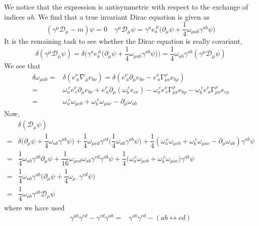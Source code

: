 \begin{recall}
We notice that the expression is antisymmetric with respect to the exchange of indices $ab$. We find that a true invariant Dirac equation is given as
\[(\gamma ^{\mu }\mathcal{D}_{\mu }-m)\psi =0\quad \gamma ^{\mu }\mathcal{D}_{\mu }\psi =\gamma ^{a}e_{a}^{\ \mu }\Big(\partial _{\mu }\psi +\dfrac{1}{4}\omega _{\mu ab}\gamma ^{ab}\psi \Big)\]
It is the remaining task to see whether the Dirac equation is really covariant,
\[\delta (\gamma ^{\mu }\mathcal{D}_{\mu }\psi )=\delta \Big(\gamma ^{a}e_{a}^{\ \mu }\Big(\partial _{\mu }\psi +\dfrac{1}{4}\omega _{\mu ab}\gamma ^{ab}\psi \Big)\Big)=\dfrac{1}{4}\omega _{ab}\gamma ^{ab}(\gamma ^{\mu }\mathcal{D}_{\mu }\psi )\]
We see that
\begin{align*}
\delta \omega _{\mu ab}=&\delta (e^{\nu }_{\ a}\nabla _{\mu }e_{b\nu })=\delta (e^{\nu }_{\ a}\partial _{\mu }e_{b\nu }-e^{\nu }_{\ a}\mathrm{\Gamma}^{\rho }_{\mu \nu }e_{b\rho })\\
=&\omega _{a}^{\ c}e^{\nu }_{\ c}\partial _{\mu }e_{b\nu }+e^{\nu }_{\ a}\partial _{\mu }(\omega _{b}^{\ c}e_{c\nu })-\omega_{a}^{\ c}e^{\nu }_{\ c}\mathrm{\Gamma}^{\rho }_{\mu \nu }e_{b\rho }-\omega _{b}^{\ c}e^{\nu }_{\ a }\mathrm{\Gamma} ^{\rho }_{\mu \nu }e_{c\rho }\\
=&\omega _{a}^{\ c}\omega _{\mu cb}+\omega _{b}^{\ c}\omega _{\mu ac}-\partial _{\mu }\omega _{ab}
\end{align*}
Now,
\begin{align*}
&\delta (\mathcal{D}_{\mu }\psi )\\=&\delta \Big(\partial _{\mu }\psi +\dfrac{1}{4}\omega _{ab}\gamma ^{ab}\psi \Big)+\dfrac{1}{4}\omega _{\mu cd}\gamma ^{c d}\Big(\dfrac{1}{4}\omega _{ab}\gamma ^{ab}\psi \Big)+\dfrac{1}{4}(\omega _{a}^{\ c}\omega _{\mu cb}+\omega _{b}^{\ c}\omega _{\mu ac}-\partial _{\mu }\omega _{ab})\gamma ^{ab}\psi \\
=&\dfrac{1}{4}\omega _{ab}\gamma ^{ab}\partial _{\mu }\psi +\dfrac{1}{16}\omega _{\mu c d}\omega _{ab}\gamma ^{c d}\gamma ^{ab}\psi +\dfrac{1}{4}\Big(\omega _{a}^{\ c}\omega _{\mu c b}+\omega _{b}^{\ c}\omega _{\mu ac}\Big)\gamma ^{ab}\psi\\
=&\dfrac{1}{4}\omega _{ab}\gamma ^{ab}\Big(\partial _{\mu }\psi +\dfrac{1}{4}\omega _{\mu \cdot }\gamma ^{cd}\psi \Big)\\
=&\dfrac{1}{4}\omega _{ab}\gamma ^{ab}\mathcal{D}_{\mu }\psi 
\end{align*}
where we have used
\begin{align*}
\gamma ^{ab}\gamma ^{cd}-\gamma ^{c d}\gamma ^{ab}=&\gamma ^{ab}\gamma ^{c d}-(ab\leftrightarrow c d)\\

\end{align*}
\end{recall}
